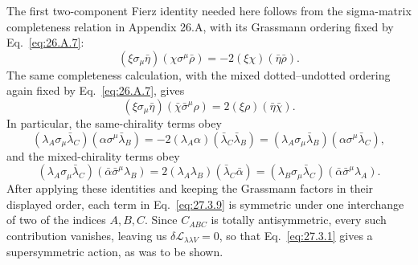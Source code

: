 The first two-component Fierz identity needed here follows from the
sigma-matrix completeness relation in Appendix 26.A, with its Grassmann
ordering fixed by Eq.~\eqref{eq:26.A.7}:
\[
  (\xi\sigma_\mu\bar\eta)(\chi\sigma^\mu\bar\rho)
  =-2(\xi\chi)(\bar\eta\bar\rho).
\]
The same completeness calculation, with the mixed dotted--undotted
ordering again fixed by Eq.~\eqref{eq:26.A.7}, gives
\[
  (\xi\sigma_\mu\bar\eta)
    (\bar\chi\bar\sigma^\mu\rho)
  =2(\xi\rho)(\bar\eta\bar\chi).
\]
In particular, the same-chirality terms obey
\[
  (\lambda_A\sigma_\mu\bar\lambda_C)
    (\alpha\sigma^\mu\bar\lambda_B)
  =-2(\lambda_A\alpha)(\bar\lambda_C\bar\lambda_B)
  =(\lambda_A\sigma_\mu\bar\lambda_B)
    (\alpha\sigma^\mu\bar\lambda_C),
\]
and the mixed-chirality terms obey
\[
  (\lambda_A\sigma_\mu\bar\lambda_C)
    (\bar\alpha\bar\sigma^\mu\lambda_B)
  =2(\lambda_A\lambda_B)(\bar\lambda_C\bar\alpha)
  =(\lambda_B\sigma_\mu\bar\lambda_C)
    (\bar\alpha\bar\sigma^\mu\lambda_A).
\]
After applying these identities and keeping the Grassmann factors in their
displayed order, each term in Eq.~\eqref{eq:27.3.9} is symmetric under
one interchange of two of the indices \(A,B,C\). Since \(C_{ABC}\) is
totally antisymmetric, every such contribution vanishes, leaving us
\(\delta\mathcal{L}_{\lambda\lambda V}=0\), so that
Eq.~\eqref{eq:27.3.1} gives a supersymmetric action, as was to be shown.

